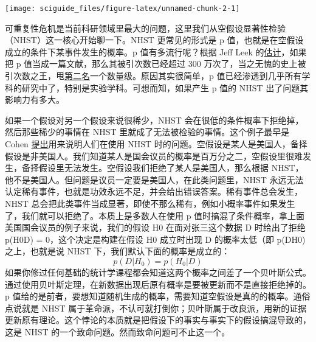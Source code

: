 \documentclass[]{tufte-book}
\begin{document}
\texttt{[image: sciguide\_files/figure-latex/unnamed-chunk-2-1]}

可重复性危机是当前科研领域里最大的问题，这里我们从空假设显著性检验（NHST）这一核心开始聊一下。NHST 更常见的形式是 p 值，也就是在空假设成立的条件下某事件发生的概率。p 值有多流行呢？根据 Jeff Leek 的\href{https://docs.google.com/presentation/d/1hzdSDaPPSE9xUYZHhOVfQIRPPdwe0A9SdE7QDsK3bOA/edit\#slide=id.g255a5ace66_3_796}{估计}，如果把 p 值当成一篇文献，那么其被引次数已经超过 300 万次了，当之无愧的史上被引次数之王，甩\href{http://www.nature.com/news/the-top-100-papers-1.16224}{第二名}一个数量级。原因其实很简单，p 值已经渗透到几乎所有学科的研究中了，特别是实验学科。可想而知，如果产生 p 值的 NHST 出了问题其影响力有多大。

如果一个假设对另一个假设来说很稀少，NHST 会在很低的条件概率下拒绝掉，然后那些稀少的事情在 NHST 里就成了无法被检验的事情。这个例子最早是 Cohen \href{http://ist-socrates.berkeley.edu/~maccoun/PP279_Cohen1.pdf}{提出}用来说明人们在使用 NHST 时的问题。空假设是某人是美国人，备择假设是非美国人。我们知道某人是国会议员的概率是百万分之二，空假设里很难发生，备择假设里无法发生。空假设我们拒绝了某人是美国人，那么根据 NHST，他不是美国人。但问题是议员一定要是美国人，在此类问题里，NHST 永远无法认定稀有事件，也就是功效永远不足，并会给出错误答案。稀有事件总会发生，NHST 总会把此类事件当成显著，即使不那么稀有，例如小概率事件如果发生了，我们就可以拒绝了。本质上是多数人在使用 p 值时搞混了条件概率，拿上面美国国会议员的例子来说，我们的假设 H0 在面对张三这个数据 D 时给出了拒绝 p(H0\textbar D) = 0，这个决定是构建在假设 H0 成立时出现 D 的概率太低（即 p(D\textbar H0)之上，也就是说 NHST 下，我们默认下面的概率是成立的：
\[
p(D|H_0) = p(H_0|D)
\]
如果你修过任何基础的统计学课程都会知道这两个概率之间差了一个贝叶斯公式。通过使用贝叶斯定理，在新数据出现后原有概率是要被更新而不是直接拒绝掉的。p 值给的是前者，要想知道随机生成的概率，需要知道空假设是真的的概率。通俗点说就是 NHST 属于革命派，不认可就打倒你；贝叶斯属于改良派，用新的证据更新原有理论。这个悖论的本质就是把假设下的事实与事实下的假设搞混导致的，这是 NHST 的一个致命问题。然而致命问题可不止这一个。
\end{document}
